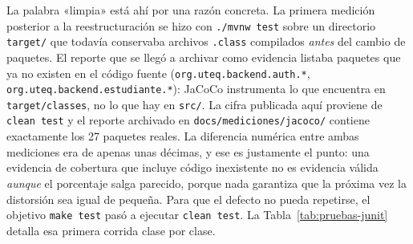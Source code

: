 \documentclass[11pt,a4paper]{article}
\begin{document}
La palabra «limpia» está ahí por una razón concreta. La primera medición
posterior a la reestructuración se hizo con \texttt{./mvnw test} sobre un
directorio \texttt{target/} que todavía conservaba archivos
\texttt{.class} compilados \emph{antes} del cambio de paquetes. El reporte
que se llegó a archivar como evidencia listaba paquetes que ya no existen
en el código fuente (\texttt{org.uteq.backend.auth.*},
\texttt{org.uteq.backend.estudiante.*}): JaCoCo instrumenta lo que
encuentra en \texttt{target/classes}, no lo que hay en \texttt{src/}. La
cifra publicada aquí proviene de \texttt{clean test} y el reporte archivado
en \texttt{docs/mediciones/jacoco/} contiene exactamente los 27 paquetes
reales. La diferencia numérica entre ambas mediciones era de apenas unas
décimas, y ese es justamente el punto: una evidencia de cobertura que
incluye código inexistente no es evidencia válida \emph{aunque} el
porcentaje salga parecido, porque nada garantiza que la próxima vez la
distorsión sea igual de pequeña. Para que el defecto no pueda repetirse,
el objetivo \texttt{make test} pasó a ejecutar \texttt{clean test}. La
Tabla~\ref{tab:pruebas-junit} detalla esa primera corrida clase por
clase.
\end{document}
